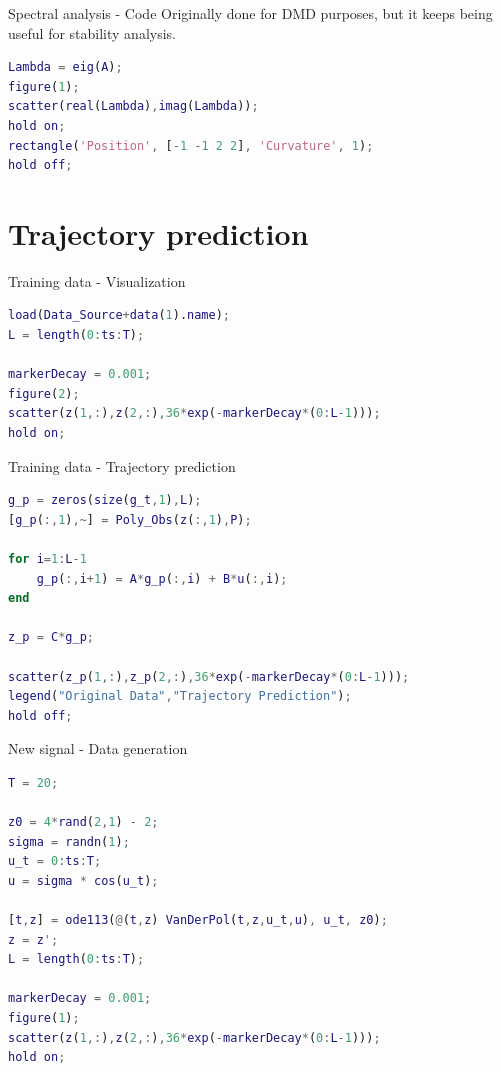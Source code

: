 \documentclass{beamer}
\begin{document}
\begin{frame}[fragile]{Spectral analysis - Code}
    Originally done for DMD purposes, but it keeps being useful for stability analysis.

    \begin{lstlisting}[language=Matlab]
Lambda = eig(A);
figure(1);
scatter(real(Lambda),imag(Lambda));
hold on;
rectangle('Position', [-1 -1 2 2], 'Curvature', 1);
hold off;
    \end{lstlisting}
\end{frame}


\section{Trajectory prediction}

\begin{frame}[fragile]{Training data - Visualization}
    \begin{lstlisting}[language=Matlab]
load(Data_Source+data(1).name);
L = length(0:ts:T);

markerDecay = 0.001;
figure(2);
scatter(z(1,:),z(2,:),36*exp(-markerDecay*(0:L-1)));
hold on;
    \end{lstlisting}
\end{frame}

\begin{frame}[fragile]{Training data - Trajectory prediction}
    \begin{lstlisting}[language=Matlab]
g_p = zeros(size(g_t,1),L);
[g_p(:,1),~] = Poly_Obs(z(:,1),P);

for i=1:L-1
    g_p(:,i+1) = A*g_p(:,i) + B*u(:,i);
end

z_p = C*g_p;

scatter(z_p(1,:),z_p(2,:),36*exp(-markerDecay*(0:L-1)));
legend("Original Data","Trajectory Prediction");
hold off;
    \end{lstlisting}
\end{frame}

\begin{frame}[fragile]{New signal - Data generation}
    \begin{lstlisting}[language=matlab]
T = 20;

z0 = 4*rand(2,1) - 2;
sigma = randn(1);
u_t = 0:ts:T;
u = sigma * cos(u_t);

[t,z] = ode113(@(t,z) VanDerPol(t,z,u_t,u), u_t, z0);
z = z';
L = length(0:ts:T);

markerDecay = 0.001;
figure(1);
scatter(z(1,:),z(2,:),36*exp(-markerDecay*(0:L-1)));
hold on;
    \end{lstlisting}
\end{frame}
\end{document}
